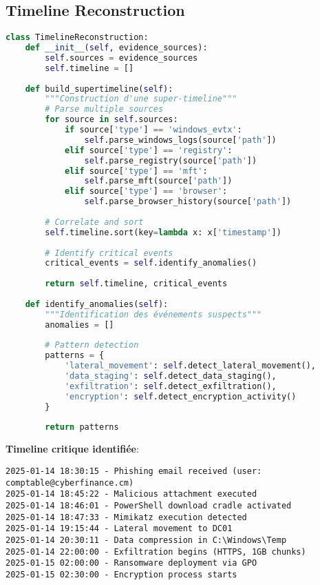 \subsection{Timeline Reconstruction}
\begin{lstlisting}[language=Python, caption=Reconstruction de la chronologie avec log2timeline]
class TimelineReconstruction:
    def __init__(self, evidence_sources):
        self.sources = evidence_sources
        self.timeline = []
    
    def build_supertimeline(self):
        """Construction d'une super-timeline"""
        # Parse multiple sources
        for source in self.sources:
            if source['type'] == 'windows_evtx':
                self.parse_windows_logs(source['path'])
            elif source['type'] == 'registry':
                self.parse_registry(source['path'])
            elif source['type'] == 'mft':
                self.parse_mft(source['path'])
            elif source['type'] == 'browser':
                self.parse_browser_history(source['path'])
        
        # Correlate and sort
        self.timeline.sort(key=lambda x: x['timestamp'])
        
        # Identify critical events
        critical_events = self.identify_anomalies()
        
        return self.timeline, critical_events
    
    def identify_anomalies(self):
        """Identification des événements suspects"""
        anomalies = []
        
        # Pattern detection
        patterns = {
            'lateral_movement': self.detect_lateral_movement(),
            'data_staging': self.detect_data_staging(),
            'exfiltration': self.detect_exfiltration(),
            'encryption': self.detect_encryption_activity()
        }
        
        return patterns
\end{lstlisting}

\textbf{Timeline critique identifiée}:

\begin{verbatim}
2025-01-14 18:30:15 - Phishing email received (user: comptable@cyberfinance.cm)
2025-01-14 18:45:22 - Malicious attachment executed
2025-01-14 18:46:01 - PowerShell download cradle activated
2025-01-14 18:47:33 - Mimikatz execution detected
2025-01-14 19:15:44 - Lateral movement to DC01
2025-01-14 20:30:11 - Data compression in C:\Windows\Temp
2025-01-14 22:00:00 - Exfiltration begins (HTTPS, 1GB chunks)
2025-01-15 02:00:00 - Ransomware deployment via GPO
2025-01-15 02:30:00 - Encryption process starts
\end{verbatim}

